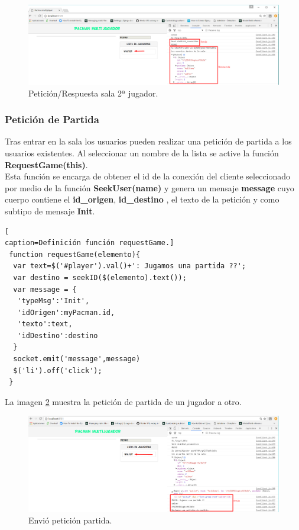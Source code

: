 \begin{figure}[!h]
\begin{center}
   \includegraphics[width=0.6\linewidth]{Figures/Init_Client_2_Room}
	\decoRule
	\caption[Petición/Respuesta sala 2ª jugador.]{Petición/Respuesta sala 2ª jugador.}
\label{fig:Init_Client_2_Room}
\end{center}
\end{figure}
\subsubsection*{Petición de Partida}
Tras entrar en la sala los usuarios pueden realizar una petición de partida a los usuarios existentes. Al seleccionar un nombre de la lista se active la función \textbf{RequestGame(this)}.
\\Esta función se encarga de obtener el id de la conexión del cliente seleccionado por medio de la función \textbf{SeekUser(name)} y genera un mensaje \textbf{message} cuyo cuerpo contiene el \textbf{id\_origen}, \textbf{id\_destino} , el texto de la petición y como subtipo de mensaje \textbf{Init}.
\begin{lstlisting}[
caption=Definición función requestGame.]
 function requestGame(elemento){
  var text=$('#player').val()+': Jugamos una partida ??';
  var destino = seekID($(elemento).text());
  var message = {
   'typeMsg':'Init',
   'idOrigen':myPacman.id,
   'texto':text,
   'idDestino':destino
  }
  socket.emit('message',message)
  $('li').off('click');
 }
\end{lstlisting}
La imagen \ref{fig:Client2_Peti_Game} muestra la petición de partida de un jugador a otro.
\begin{figure}[!h]
\begin{center}
   \includegraphics[width=0.8\linewidth]{Figures/Client2_Peti_Game}
	\decoRule
	\caption[Envió petición partida.]{Envió petición partida.}
\label{fig:Client2_Peti_Game}
\end{center}
\end{figure}
